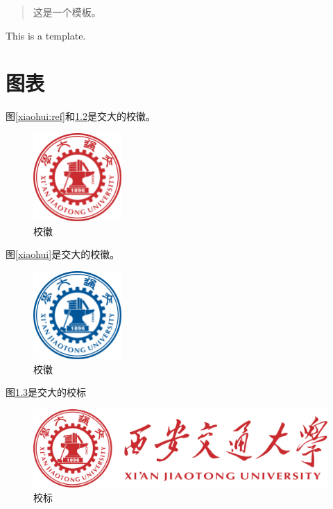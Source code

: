 \documentclass[bachelor]{XJTUthesis}
\begin{document}

\tableofcontents
\thispagestyle{empty}
\setcounter{page}{0}
\newpage

\begin{abstract}
这是一个模板。
\end{abstract}
\newpage
\begin{eabstract}
This is a template.
\end{eabstract}

\chapter{图表}
图\ref{xiaohui:ref}和\ref{xiaohui:blue}是交大的校徽。
\begin{figure}[htbp]
  \centering
  \includegraphics[width=0.3\textwidth]{figures//a3_1jdxhred.png}
  \caption{校徽}\label{xiaohui:red}
\end{figure}

图\ref{xiaohui}是交大的校徽。
\begin{figure}[htbp]
  \centering
  \includegraphics[width=0.3\textwidth]{figures//a3_2jdxhblue.png}
  \caption{校徽}\label{xiaohui:blue}
\end{figure}

图\ref{xiaobiao}是交大的校标
\begin{figure}[htbp]
  \centering
  \includegraphics[width=1\textwidth]{figures//a4_2xbred.png}
  \caption{校标}\label{xiaobiao}
\end{figure}
\end{document}
